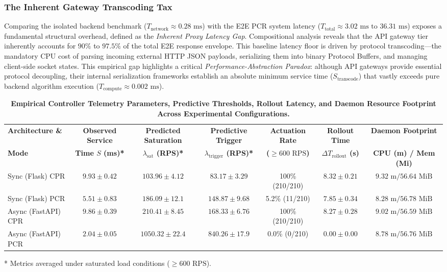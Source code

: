 \documentclass{ieeeaccess}
\begin{document}
\subsubsection{The Inherent Gateway Transcoding Tax}
Comparing the isolated backend benchmark ($T_{\text{network}} \approx 0.28\text{ ms}$) with the E2E PCR system latency ($T_{\text{total}} \approx 3.02\text{ ms } \text{to } 36.31\text{ ms}$) exposes a fundamental structural overhead, defined as the \textit{Inherent Proxy Latency Gap}. Compositional analysis reveals that the API gateway tier inherently accounts for $90\%$ to $97.5\%$ of the total E2E response envelope. This baseline latency floor is driven by protocol transcoding—the mandatory CPU cost of parsing incoming external HTTP JSON payloads, serializing them into binary Protocol Buffers, and managing client-side socket states. This empirical gap highlights a critical \textit{Performance-Abstraction Paradox}: although API gateways provide essential protocol decoupling, their internal serialization frameworks establish an absolute minimum service time ($S_{\text{transcode}}$) that vastly exceeds pure backend algorithm execution ($T_{\text{compute}} \approx 0.002\text{ ms}$).

\begin{table}[htbp]
	\centering
	\caption{\textbf{Empirical Controller Telemetry Parameters, Predictive Thresholds, Rollout Latency, and Daemon Resource Footprint Across Experimental Configurations.}}
	\label{tab:controller-telemetry-summary}
	\setlength{\tabcolsep}{4pt}
	\begin{tabular}{lcccccc}
		\hline
		\textbf{Architecture \&} & \textbf{Observed Service} & \textbf{Predicted Saturation} & \textbf{Predictive Trigger} & \textbf{Actuation Rate} & \textbf{Rollout Time} & \textbf{Daemon Footprint} \\
		\textbf{Mode} & \textbf{Time {$S$} (ms)*} & \textbf{{$\lambda_{\text{sat}}$} (RPS)*} & \textbf{{$\lambda_{\text{trigger}}$} (RPS)*} & \textbf{({$\ge 600\text{ RPS}$})} & \textbf{{$\Delta T_{\text{rollout}}$} (s)} & \textbf{CPU (m) / Mem (Mi)} \\
		\hline
		Sync (Flask) CPR    & $9.93 \pm 0.42$ & $103.96 \pm 4.12$ & $83.17 \pm 3.29$ & 100\% (210/210) & $8.32 \pm 0.21$ & $9.32\text{ m} / 56.64\text{ MiB}$ \\
		Sync (Flask) PCR    & $5.51 \pm 0.83$ & $186.09 \pm 12.1$ & $148.87 \pm 9.68$ & 5.2\% (11/210)  & $7.85 \pm 0.34$ & $8.28\text{ m} / 56.78\text{ MiB}$ \\
		Async (FastAPI) CPR & $9.86 \pm 0.39$ & $210.41 \pm 8.45$ & $168.33 \pm 6.76$ & 100\% (210/210) & $8.27 \pm 0.28$ & $9.02\text{ m} / 56.59\text{ MiB}$ \\
		Async (FastAPI) PCR & $2.04 \pm 0.05$ & $1050.32 \pm 22.4$ & $840.26 \pm 17.9$ & 0.0\% (0/210)   & $0.00 \pm 0.00$ & $8.78\text{ m} / 56.76\text{ MiB}$ \\
		\hline
	\end{tabular}
	\begin{flushleft}
		\small{* Metrics averaged under saturated load conditions ($\ge 600\text{ RPS}$).}
	\end{flushleft}
\end{table}
\end{document}
